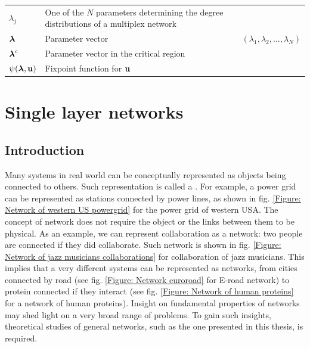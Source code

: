 \documentclass[
11pt, %
english, %
singlespacing, %
nolistspacing, %
liststotoc, %
headsepline, %
]{MastersDoctoralThesis} %
\begin{document}
\begin{longtable}{m{}m{}m{}}
\addlinespace
\addlinespace
\addlinespace

$\lambda_j$ 	& One of the $N$ parameters determining the degree distributions of a multiplex network \\
$\boldsymbol{\mathrm{\lambda}}$	& Parameter vector & $(\lambda_1, \lambda_2, \dots, \lambda_N)$ \\
$\boldsymbol{\mathrm{\lambda}}^c$	& Parameter vector in the critical region \\
$\psi(\boldsymbol{\mathrm{\lambda}}, \boldsymbol{\mathrm{u}})$			& Fixpoint function for $\boldsymbol{\mathrm{u}}$ \\

\end{longtable}




\listoftodos

\mainmatter %

\pagestyle{thesis} %


\chapter{Single layer networks}
\label{Section: Single layer networks}

\section{Introduction}

Many systems in real world can be conceptually represented as objects being connected to others. Such representation is called a . For example, a power grid can be represented as stations connected by power lines, as shown in fig. \ref{Figure: Network of western US powergrid} for the power grid of western USA. The concept of network does not require the object or the links between them to be physical. As an example, we can represent collaboration as a network: two people are connected if they did collaborate. Such network is shown in fig. \ref{Figure: Network of jazz musicians collaborations} for collaboration of jazz musicians. This implies that a very different systems can be represented as networks, from cities connected by road (see fig. \ref{Figure: Network euroroad} for E-road network) to protein connected if they interact (see fig. \ref{Figure: Network of human proteins} for a network of human proteins). Insight on fundamental properties of networks may shed light on a very broad range of problems. To gain such insights, theoretical studies of general networks, such as the one presented in this thesis, is required.
\end{document}
